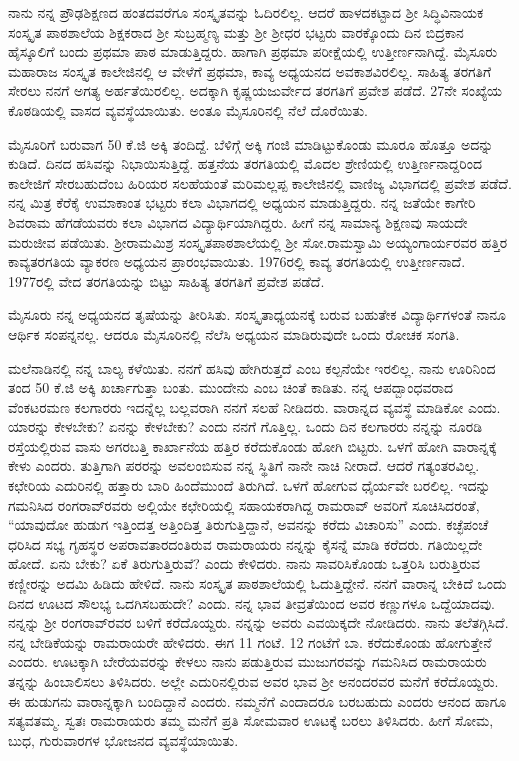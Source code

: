 ನಾನು ನನ್ನ ಪ್ರೌಢಶಿಕ್ಷಣದ ಹಂತದವರೆಗೂ ಸಂಸ್ಕೃತವನ್ನು ಓದಿರಲಿಲ್ಲ.   ಆದರೆ ಹಾಳದಕಟ್ಟಾದ ಶ್ರೀ ಸಿದ್ಧಿವಿನಾಯಕ ಸಂಸ್ಕೃತ ಪಾಠಶಾಲೆಯ ಶಿಕ್ಷಕರಾದ ಶ್ರೀ ಸುಬ್ರಹ್ಮಣ್ಯ ಮತ್ತು ಶ್ರೀ ಶ್ರೀಧರ ಭಟ್ಟರು ವಾರಕ್ಕೊಂದು ದಿನ ಬಿದ್ರಕಾನ ಹೈಸ್ಕೂಲಿಗೆ ಬಂದು ಪ್ರಥಮಾ ಪಾಠ ಮಾಡುತ್ತಿದ್ದರು.  ಹಾಗಾಗಿ ಪ್ರಥಮಾ ಪರೀಕ್ಷೆಯಲ್ಲಿ ಉತ್ತೀರ್ಣನಾಗಿದ್ದೆ.  ಮೈಸೂರು ಮಹಾರಾಜ ಸಂಸ್ಕೃತ ಕಾಲೇಜಿನಲ್ಲಿ ಆ ವೇಳೆಗೆ ಪ್ರಥಮಾ, ಕಾವ್ಯ ಅಧ್ಯಯನದ ಅವಕಾಶವಿರಲಿಲ್ಲ.  ಸಾಹಿತ್ಯ ತರಗತಿಗೆ ಸೇರಲು ನನಗೆ ಅಗತ್ಯ ಅರ್ಹತೆಯಿರಲಿಲ್ಲ.  ಅದಕ್ಕಾಗಿ ಕೃಷ್ಣಯಜುರ್ವೇದ  ತರಗತಿಗೆ ಪ್ರವೇಶ ಪಡೆದೆ.  27ನೇ ಸಂಖ್ಯೆಯ ಕೊಠಡಿಯಲ್ಲಿ ವಾಸದ ವ್ಯವಸ್ಥೆಯಾಯಿತು. ಅಂತೂ ಮೈಸೂರಿನಲ್ಲಿ ನೆಲೆ ದೊರೆಯಿತು.

ಮೈಸೂರಿಗೆ ಬರುವಾಗ 50 ಕೆ.ಜಿ ಅಕ್ಕಿ ತಂದಿದ್ದೆ.  ಬೆಳಿಗ್ಗೆ ಅಕ್ಕಿ ಗಂಜಿ ಮಾಡಿಟ್ಟುಕೊಂಡು ಮೂರೂ ಹೊತ್ತೂ ಅದನ್ನು ಕುಡಿದೆ.  ದಿನದ ಹಸಿವನ್ನು ನಿಭಾಯಿಸುತ್ತಿದ್ದೆ.  ಹತ್ತನೆಯ ತರಗತಿಯಲ್ಲಿ ಮೊದಲ ಶ್ರೇಣಿಯಲ್ಲಿ ಉತ್ತಿರ್ಣನಾದ್ದರಿಂದ ಕಾಲೇಜಿಗೆ ಸೇರಬಹುದೆಂಬ ಹಿರಿಯರ ಸಲಹೆಯಂತೆ ಮರಿಮಲ್ಲಪ್ಪ ಕಾಲೇಜಿನಲ್ಲಿ ವಾಣಿಜ್ಯ ವಿಭಾಗದಲ್ಲಿ ಪ್ರವೇಶ ಪಡೆದೆ.  ನನ್ನ ಮಿತ್ರ ಕೆರೆಕೈ ಉಮಾಕಾಂತ ಭಟ್ಟರು ಕಲಾ ವಿಭಾಗದಲ್ಲಿ ಅಧ್ಯಯನ ಮಾಡುತ್ತಿದ್ದರು.  ನನ್ನ ಜತೆಯೇ ಕಾಗೇರಿ ಶಿವರಾಮ ಹೆಗಡೆಯವರು ಕಲಾ ವಿಭಾಗದ ವಿದ್ಯಾರ್ಥಿಯಾಗಿದ್ದರು.  ಹೀಗೆ ನನ್ನ ಸಾಮಾನ್ಯ ಶಿಕ್ಷಣವು ಸಾಯದೇ ಮರುಜೀವ ಪಡೆಯಿತು.  ಶ್ರೀರಾಮಮಿಶ್ರ ಸಂಸ್ಕೃತಪಾಠಶಾಲೆಯಲ್ಲಿ     ಶ್ರೀ ಸೋ.ರಾಮಸ್ವಾಮಿ ಅಯ್ಯಂಗಾರ್ಯರವರ ಹತ್ತಿರ ಕಾವ್ಯತರಗತಿಯ ವ್ಯಾಕರಣ ಅಧ್ಯಯನ ಪ್ರಾರಂಭವಾಯಿತು.  1976ರಲ್ಲಿ ಕಾವ್ಯ ತರಗತಿಯಲ್ಲಿ ಉತ್ತೀರ್ಣನಾದೆ.  1977ರಲ್ಲಿ ವೇದ ತರಗತಿಯನ್ನು ಬಿಟ್ಟು ಸಾಹಿತ್ಯ ತರಗತಿಗೆ ಪ್ರವೇಶ ಪಡೆದೆ.

ಮೈಸೂರು ನನ್ನ ಅಧ್ಯಯನದ ತೃಷೆಯನ್ನು ತೀರಿಸಿತು.  ಸಂಸ್ಕೃತಾಧ್ಯಯನಕ್ಕೆ ಬರುವ ಬಹುತೇಕ ವಿದ್ಯಾರ್ಥಿಗಳಂತೆ ನಾನೂ ಆರ್ಥಿಕ ಸಂಪನ್ನನಲ್ಲ.  ಆದರೂ ಮೈಸೂರಿನಲ್ಲಿ ನೆಲೆಸಿ ಅಧ್ಯಯನ ಮಾಡಿರುವುದೇ ಒಂದು ರೋಚಕ ಸಂಗತಿ. 

ಮಲೆನಾಡಿನಲ್ಲಿ ನನ್ನ ಬಾಲ್ಯ ಕಳೆಯಿತು.  ನನಗೆ ಹಸಿವು ಹೇಗಿರುತ್ತದೆ ಎಂಬ ಕಲ್ಪನೆಯೇ ಇರಲಿಲ್ಲ.  ನಾನು ಊರಿನಿಂದ  ತಂದ 50 ಕೆ.ಜಿ ಅಕ್ಕಿ ಖರ್ಚಾಗುತ್ತಾ ಬಂತು.  ಮುಂದೇನು ಎಂಬ ಚಿಂತೆ ಕಾಡಿತು.  ನನ್ನ ಆಪದ್ಬಾಂಧವರಾದ ವೆಂಕಟರಮಣ ಕಲಗಾರರು ಇದನ್ನೆಲ್ಲ ಬಲ್ಲವರಾಗಿ ನನಗೆ ಸಲಹೆ ನೀಡಿದರು.  ವಾರಾನ್ನದ ವ್ಯವಸ್ಥೆ ಮಾಡಿಕೋ ಎಂದು.  ಯಾರನ್ನು ಕೇಳಬೇಕು? ಏನನ್ನು ಕೇಳಬೇಕು? ಎಂದು ನನಗೆ ಗೊತ್ತಿಲ್ಲ.  ಒಂದು ದಿನ ಕಲಗಾರರು ನನ್ನನ್ನು ನೂರಡಿ ರಸ್ತೆಯಲ್ಲಿರುವ ವಾಸು ಅಗರಬತ್ತಿ ಕಾರ್ಖಾನೆಯ ಹತ್ತಿರ ಕರೆದುಕೊಂಡು ಹೋಗಿ ಬಿಟ್ಟರು.  ಒಳಗೆ ಹೋಗಿ ವಾರಾನ್ನಕ್ಕೆ ಕೇಳು ಎಂದರು.  ತುತ್ತಿಗಾಗಿ ಪರರನ್ನು ಅವಲಂಬಿಸುವ ನನ್ನ ಸ್ಥಿತಿಗೆ ನಾನೇ ನಾಚಿ ನೀರಾದೆ.  ಆದರೆ ಗತ್ಯಂತರವಿಲ್ಲ.  ಕಛೇರಿಯ ಎದುರಿನಲ್ಲಿ ಹತ್ತಾರು ಬಾರಿ ಹಿಂದೆಮುಂದೆ ತಿರುಗಿದೆ.  ಒಳಗೆ ಹೋಗುವ ಧೈರ್ಯವೇ ಬರಲಿಲ್ಲ.  ಇದನ್ನು ಗಮನಿಸಿದ ರಂಗರಾವ್‍ರವರು ಅಲ್ಲಿಯೇ ಕಛೇರಿಯಲ್ಲಿ ಸಹಾಯಕರಾಗಿದ್ದ ರಾಮರಾವ್ ಅವರಿಗೆ ಸೂಚಿಸಿದರಂತೆ,  “ಯಾವುದೋ ಹುಡುಗ ಇತ್ತಿಂದತ್ತ ಅತ್ತಿಂದಿತ್ತ  ತಿರುಗುತ್ತಿದ್ದಾನೆ, ಅವನನ್ನು ಕರೆದು ವಿಚಾರಿಸು” ಎಂದು.  ಕಚ್ಛೆಪಂಚೆ ಧರಿಸಿದ ಸಭ್ಯ ಗೃಹಸ್ಥರ ಅಪರಾವತಾರದಂತಿರುವ ರಾಮರಾಯರು ನನ್ನನ್ನು ಕೈಸನ್ನೆ ಮಾಡಿ ಕರೆದರು.  ಗತಿಯಿಲ್ಲದೇ ಹೋದೆ. ಏನು ಬೇಕು? ಏಕೆ ತಿರುಗುತ್ತಿರುವೆ? ಎಂದು ಕೇಳಿದರು.  ನಾನು ಸಾವರಿಸಿಕೊಂಡು ಒತ್ತರಿಸಿ ಬರುತ್ತಿರುವ ಕಣ್ಣೀರನ್ನು ಅದಮಿ ಹಿಡಿದು ಹೇಳಿದೆ.  ನಾನು ಸಂಸ್ಕೃತ ಪಾಠಶಾಲೆಯಲ್ಲಿ ಓದುತ್ತಿದ್ದೇನೆ. ನನಗೆ ವಾರಾನ್ನ ಬೇಕಿದೆ ಒಂದು ದಿನದ ಊಟದ ಸೌಲಭ್ಯ ಒದಗಿಸಬಹುದೇ? ಎಂದು.  ನನ್ನ ಭಾವ ತೀವ್ರತೆಯಿಂದ ಅವರ ಕಣ್ಣುಗಳೂ ಒದ್ದೆಯಾದವು.  ನನ್ನನ್ನು ಶ್ರೀ ರಂಗರಾವ್‍ರವರ ಬಳಿಗೆ ಕರೆದೊಯ್ದರು.  ನನ್ನನ್ನು ಅವರು ಎವಯಿಕ್ಕದೇ ನೋಡಿದರು.  ನಾನು ತಲೆತಗ್ಗಿಸಿದೆ.  ನನ್ನ ಬೇಡಿಕೆಯನ್ನು ರಾಮರಾಯರೇ ಹೇಳಿದರು.  ಈಗ 11 ಗಂಟೆ. 12 ಗಂಟೆಗೆ ಬಾ. ಕರೆದುಕೊಂಡು ಹೋಗುತ್ತೇನೆ ಎಂದರು.  ಊಟಕ್ಕಾಗಿ ಬೇರೆಯವರನ್ನು ಕೇಳಲು ನಾನು ಪಡುತ್ತಿರುವ ಮುಜುಗರವನ್ನು ಗಮನಿಸಿದ ರಾಮರಾಯರು ತನ್ನನ್ನು ಹಿಂಬಾಲಿಸಲು ತಿಳಿಸಿದರು.  ಅಲ್ಲೇ ಎದುರಿನಲ್ಲಿರುವ ಅವರ ಭಾವ ಶ್ರೀ ಅನಂದರವರ ಮನೆಗೆ ಕರೆದೊಯ್ದರು.  ಈ ಹುಡುಗನು ವಾರಾನ್ನಕ್ಕಾಗಿ ಬಂದಿದ್ದಾನೆ ಎಂದರು. ನಮ್ಮನೆಗೆ ಎಂದಾದರೂ ಬರಬಹುದು ಎಂದರು ಆನಂದ ಹಾಗೂ ಸತ್ಯವತಮ್ಮ. ಸ್ವತಃ ರಾಮರಾಯರು ತಮ್ಮ ಮನೆಗೆ ಪ್ರತಿ ಸೋಮವಾರ ಊಟಕ್ಕೆ ಬರಲು ತಿಳಿಸಿದರು.  ಹೀಗೆ ಸೋಮ, ಬುಧ, ಗುರುವಾರಗಳ ಭೋಜನದ ವ್ಯವಸ್ಥೆಯಾಯಿತು. 

